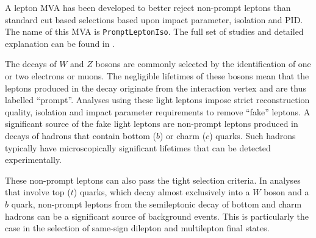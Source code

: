 
A lepton MVA has been developed to better reject non-prompt leptons than standard cut based selections based upon impact parameter, isolation and PID. The name of this MVA is \texttt{PromptLeptonIso}. The full set of studies and detailed explanation can be found in \cite{ttW_fullR2}.

The decays of $W$ and $Z$ bosons are commonly selected by the identification of one or two electrons or muons.  The negligible lifetimes of these bosons mean that the leptons produced in the decay originate from the interaction vertex and are thus labelled ``prompt''.  Analyses using these light leptons impose strict reconstruction quality, isolation and impact parameter requirements to remove ``fake'' leptons. A significant source of the fake light leptons are non-prompt leptons produced in decays of hadrons that contain bottom ($b$) or charm ($c$) quarks. Such hadrons typically have microscopically significant lifetimes that can be detected experimentally.

These non-prompt leptons can also pass the tight selection criteria. In analyses that involve top ($t$) quarks, which decay almost exclusively into a $W$ boson and a $b$ quark, non-prompt leptons from the semileptonic decay of bottom and charm hadrons can be a significant source of background events. This is particularly the case in the selection of same-sign dilepton and multilepton final states. 

